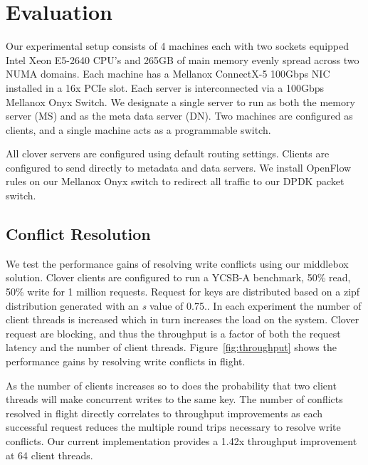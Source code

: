\section{Evaluation}

Our experimental setup consists of 4 machines each with two sockets
equipped Intel Xeon E5-2640 CPU's and 265GB of main memory evenly
spread across two NUMA domains. Each machine has a Mellanox ConnectX-5
100Gbps NIC installed in a 16x PCIe slot. Each server is
interconnected via a 100Gbps Mellanox Onyx Switch. We designate a
single server to run as both the memory server (MS) and as the meta
data server (DN). Two machines are configured as clients, and a single
machine acts as a programmable switch.

All clover servers are configured using default routing settings.
Clients are configured to send directly to metadata and data servers.
We install OpenFlow rules on our Mellanox Onyx switch to redirect all
traffic to our DPDK packet switch.

\subsection{Conflict Resolution}

We test the performance gains of resolving write conflicts using our
middlebox solution. Clover clients are configured to run a YCSB-A
benchmark, 50\% read, 50\% write for 1 million requests. Request for
keys are distributed based on a zipf distribution generated with an
\textit{s} value of 0.75.. In each
experiment the number of client threads is increased which in turn
increases the load on the system. Clover request are blocking, and
thus the throughput is a factor of both the request latency and the
number of client threads. Figure~\ref{fig:throughput} shows the
performance gains by resolving write conflicts in flight.

As the number of clients increases so to does the probability that two
client threads will make concurrent writes to the same key. The number
of conflicts resolved in flight directly correlates to throughput
improvements as each successful request reduces the multiple round
trips necessary to resolve write conflicts. Our current implementation
provides a 1.42x throughput improvement at 64 client threads.

